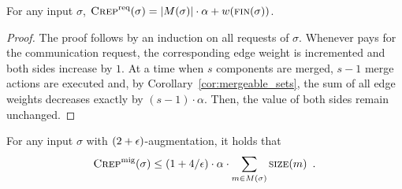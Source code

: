 \begin{lemma}
\label{lem:crep_req}
For any input $\sigma$, $\textsc{Crep}^\textnormal{req}(\sigma) = |M(\sigma)| \cdot \alpha + w(\textsc{fin}(\sigma))$.
\end{lemma}

\begin{proof}
The proof follows by an induction on all requests of $\sigma$. Whenever \CREP
pays for the communication request, the corresponding edge weight is incremented
and both sides increase by $1$. At a time when $s$ components are merged, $s-1$
merge actions are executed and, by Corollary~\ref{cor:mergeable_sets}, the sum of all
edge weights decreases exactly by $(s-1) \cdot \alpha$. Then, the value of both
sides remain unchanged.
\end{proof}

\begin{lemma}
\label{lem:crep_mig}
For any input $\sigma$ with $(2+\epsilon)$-augmentation, it holds that
\[
\textsc{Crep}^\textnormal{mig}(\sigma) \leq (1+4/\epsilon) \cdot \alpha \cdot \sum_{m \in M(\sigma)} \textsc{size}(m)\enspace.
\]
\end{lemma}


